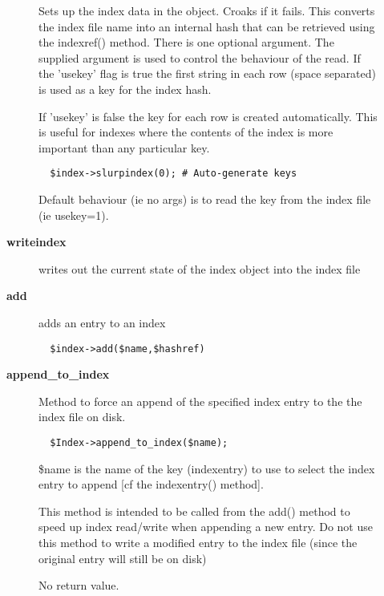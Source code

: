 \begin{description}
\begin{description}
Sets up the index data in the object. Croaks if it fails.  This
converts the index file name into an internal hash that can be
retrieved using the indexref() method.  There is one optional
argument.  The supplied argument is used to control the behaviour of
the read. If the 'usekey' flag is true the first string in each row
(space separated) is used as a key for the index hash.



If 'usekey' is false the key for each row is created
automatically. This is useful for indexes where the contents
of the index is more important than any particular key.

\begin{verbatim}
  $index->slurpindex(0); # Auto-generate keys
\end{verbatim}


Default behaviour (ie no args) is to read the key from the
index file (ie usekey=1).


\item[{\textbf{writeindex}}] \mbox{}

writes out the current state of the index object into the index file


\item[{\textbf{add}}] \mbox{}

adds an entry to an index

\begin{verbatim}
  $index->add($name,$hashref)
\end{verbatim}

\item[{\textbf{append\_to\_index}}] \mbox{}

Method to force an append of the specified index entry to the
the index file on disk.

\begin{verbatim}
  $Index->append_to_index($name);
\end{verbatim}


\$name is the name of the key (indexentry) to use to select the
index entry to append [cf the indexentry() method].



This method is intended to be called from the add() method
to speed up index read/write when appending a new entry.
Do not use this method to write a modified entry to the
index file (since the original entry will still be on disk)



No return value.



\end{description}
\end{description}
